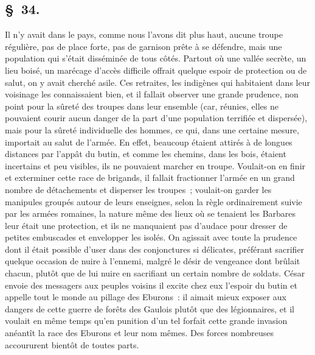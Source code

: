 \documentclass[french,twoside]{book} %
\begin{document}
\subsection[{§ 34.}]{ \textsc{§ 34.} }
\noindent Il n’y avait dans le pays, comme nous l’avons dit plus haut, aucune troupe régulière, pas de place forte, pas de garnison prête à se défendre, mais une population qui s’était disséminée de tous côtés. Partout où une vallée secrète, un lieu boisé, un marécage d’accès difficile offrait quelque espoir de protection ou de salut, on y avait cherché asile. Ces retraites, les indigènes qui habitaient dans leur voisinage les connaissaient bien, et il fallait observer une grande prudence, non point pour la sûreté des troupes dans leur ensemble (car, réunies, elles ne pouvaient courir aucun danger de la part d’une population terrifiée et dispersée), mais pour la sûreté individuelle des hommes, ce qui, dans une certaine mesure, importait au salut de l’armée. En effet, beaucoup étaient attirés à de longues distances par l’appât du butin, et comme les chemins, dans les bois, étaient incertains et peu visibles, ils ne pouvaient marcher en troupe. Voulait-on en finir et exterminer cette race de brigands, il fallait fractionner l’armée en un grand nombre de détachements et disperser les troupes ; voulait-on garder les manipules groupés autour de leurs enseignes, selon la règle ordinairement suivie par les armées romaines, la nature même des lieux où se tenaient les Barbares leur était une protection, et ils ne manquaient pas d’audace pour dresser de petites embuscades et envelopper les isolés. On agissait avec toute la prudence dont il était possible d’user dans des conjonctures si délicates, préférant sacrifier quelque occasion de nuire à l’ennemi, malgré le désir de vengeance dont brûlait chacun, plutôt que de lui nuire en sacrifiant un certain nombre de soldats. César envoie des messagers aux peuples voisins il excite chez eux l’espoir du butin et appelle tout le monde au pillage des Eburons : il aimait mieux exposer aux dangers de cette guerre de forêts des Gaulois plutôt que des légionnaires, et il voulait en même temps qu’en punition d’un tel forfait cette grande invasion anéantît la race des Eburons et leur nom mêmes. Des forces nombreuses accoururent bientôt de toutes parts.
\end{document}
